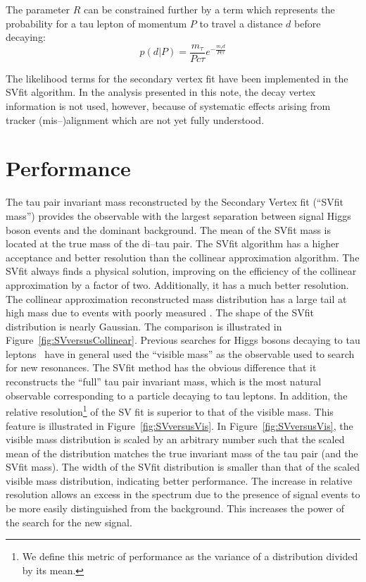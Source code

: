 The parameter $R$ can be constrained further by a term which represents the
probability for a tau lepton of momentum $P$ to travel a distance $d$ before
decaying:
\begin{equation*}
p \left( d | P \right) = \frac{m_\tau}{P c\tau}e^{-\frac{m_\tau d}{P c\tau}}
\end{equation*}

The likelihood terms for the secondary vertex fit have been implemented in the
SVfit algorithm.  In the analysis presented in this note, the decay vertex
information is not used, however, because of systematic effects arising from
tracker (mis--)alignment which are not yet fully understood.

\section{Performance}

The tau pair invariant mass reconstructed by the Secondary Vertex fit (``SVfit
mass'') provides the observable with the largest separation between signal Higgs
boson events and the dominant \ZTT background.  The mean of the SVfit mass is
located at the true mass of the di--tau pair.  The SVfit algorithm has a higher
acceptance and better resolution than the collinear approximation algorithm.
The SVfit always finds a physical solution, improving on the efficiency of the
collinear approximation by a factor of two.  Additionally, it has a much better
resolution.  The collinear approximation reconstructed mass distribution has a
large tail at high mass due to events with poorly measured \MET\@.  The shape of
the SVfit distribution is nearly Gaussian.  The comparison is illustrated in
Figure~\ref{fig:SVversusCollinear}.  Previous searches for Higgs bosons decaying
to tau leptons~\cite{CDFMSSMHiggs} have in general used the ``visible mass'' as
the observable used to search for new resonances.  The SVfit method has the
obvious difference that it reconstructs the ``full'' tau pair invariant mass,
which is the most natural observable corresponding to a particle decaying to tau
leptons.  In addition, the relative resolution\footnote{We define this metric of
performance as the variance of a distribution divided by its mean.} of the SV
fit is superior to that of the visible mass.  This feature is illustrated in
Figure~\ref{fig:SVversusVis}.  In Figure~\ref{fig:SVversusVis}, the visible mass
distribution is scaled by an arbitrary number such that the scaled mean of the
distribution matches the true invariant mass of the tau pair (and the SVfit
mass).  The width of the SVfit distribution is smaller than that of the scaled
visible mass distribution, indicating better performance.  The increase in
relative resolution allows an excess in the spectrum due to the presence of
signal events to be more easily distinguished from the \ZTT background.  This
increases the power of the search for the new signal.

